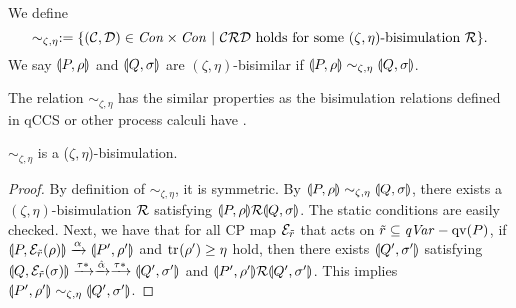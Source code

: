 \begin{defi}
\label{par:defofzetaeta}
 We define 
 \[
 \sim_{\zeta, \eta} := \{(\mathcal{C}, \mathcal{D}) \in \mathit{Con} \times \mathit{Con}~|~
 \mathcal{C}\mathcal{R}\mathcal{D} \mbox{ holds for some } (\zeta,\eta)\mbox{-bisimulation }
 \mathcal{R}\}.
 \]
 We say $\llparenthesis P, \rho \rrparenthesis$ and $\llparenthesis Q, \sigma \rrparenthesis$
 are $(\zeta, \eta)$-bisimilar if
 $\llparenthesis P, \rho \rrparenthesis \sim_{\zeta, \eta} \llparenthesis Q, \sigma \rrparenthesis$.
\end{defi}
The relation $\sim_{\zeta, \eta}$ has the similar properties
as the bisimulation relations defined in qCCS or other process 
calculi have \cite{Milner1999}.

\begin{lem}
\label{par:alsobisimulation}
$\sim_{\zeta,\eta}$ is a ($\zeta,\eta$)-bisimulation.
\end{lem}
\begin{proof}
By definition of $\sim_{\zeta, \eta}$, it is symmetric.
By $\llparenthesis P, \rho \rrparenthesis\sim_{\zeta, \eta}\llparenthesis Q, \sigma \rrparenthesis$,
there exists a $(\zeta, \eta)$-bisimulation
$\mathcal{R}$ satisfying $\llparenthesis P, \rho \rrparenthesis\mathcal{R}\llparenthesis Q, \sigma \rrparenthesis$.
The static conditions are easily checked.
Next, we have that for all CP map $\mathcal{E}_{\tilde r}$ that acts on 
$\tilde r \subseteq \mathit{qVar} - \mathrm{qv}(P)$, 
 if $\llparenthesis P, \mathcal{E}_{\tilde r}(\rho) \rrparenthesis \xrightarrow{\alpha} \llparenthesis P', \rho' \rrparenthesis$
 and ${\rm tr}_{}(\rho') \ge \eta$ hold,
 then there exists
 $\llparenthesis Q', \sigma' \rrparenthesis$ satisfying
 $\llparenthesis Q, \mathcal{E}_{\tilde r}(\sigma) \rrparenthesis \xrightarrow{\tau*} \xrightarrow{\hat \alpha} \xrightarrow{\tau*} \llparenthesis Q', \sigma' \rrparenthesis$
 and 
 $\llparenthesis P', \rho' \rrparenthesis\mathcal{R}\llparenthesis Q', \sigma' \rrparenthesis$.
 This implies
 $\llparenthesis P', \rho' \rrparenthesis\sim_{\zeta, \eta}\llparenthesis Q', \sigma' \rrparenthesis$.
\end{proof}

